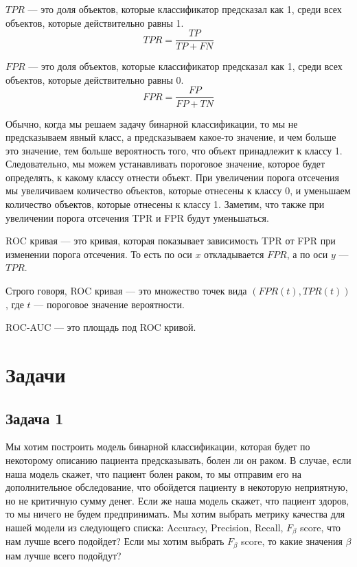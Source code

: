 $TPR$ --- это доля объектов, которые классификатор предсказал как 1, среди всех объектов, которые действительно равны 1.
$$
    TPR = \frac{TP}{TP + FN}
$$

$FPR$ --- это доля объектов, которые классификатор предсказал как 1, среди всех объектов, которые действительно равны 0.
$$
    FPR = \frac{FP}{FP + TN}
$$

Обычно, когда мы решаем задачу бинарной классификации, то мы не предсказываем явный класс, а предсказываем какое-то значение, и чем больше это значение, тем больше вероятность того, что объект принадлежит к классу 1.
Следовательно, мы можем устанавливать пороговое значение, которое будет определять, к какому классу отнести объект.
При увеличении порога отсечения мы увеличиваем количество объектов, которые отнесены к классу 0, и уменьшаем количество объектов, которые отнесены к классу 1.
Заметим, что также при увеличении порога отсечения TPR и FPR будут уменьшаться.

ROC кривая --- это кривая, которая показывает зависимость TPR от FPR при изменении порога отсечения. То есть по оси $x$ откладывается $FPR$, а по оси $y$ --- $TPR$.

Строго говоря, ROC кривая --- это множество точек вида $(FPR(t), TPR(t))$, где $t$ --- пороговое значение вероятности.

ROC-AUC --- это площадь под ROC кривой.

\section*{Задачи}
\subsection*{Задача 1}

Мы хотим построить модель бинарной классификации, которая будет по некоторому описанию пациента предсказывать, болен ли он раком.
В случае, если наша модель скажет, что пациент болен раком, то мы отправим его на дополнительное обследование, что обойдется пациенту в некоторую неприятную, но не критичную сумму денег.
Если же наша модель скажет, что пациент здоров, то мы ничего не будем предпринимать.
Мы хотим выбрать метрику качества для нашей модели из следующего списка: Accuracy, Precision, Recall, $F_{\beta}$ score, что нам лучше всего подойдет?
Если мы хотим выбрать $F_{\beta}$ score, то какие значения $\beta$ нам лучше всего подойдут?

